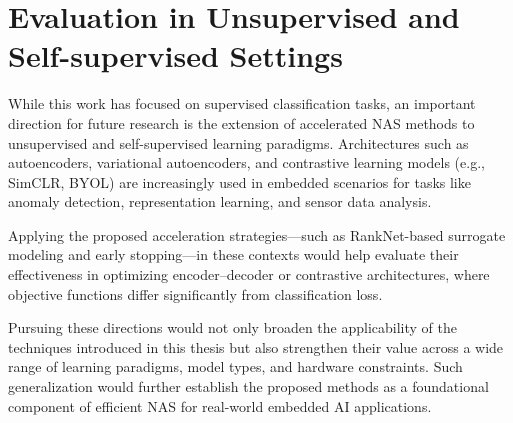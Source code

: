 \section{Evaluation in Unsupervised and Self-supervised Settings}

While this work has focused on supervised classification tasks, an important direction for future research is the extension of accelerated NAS methods to unsupervised and self-supervised learning paradigms. Architectures such as autoencoders, variational autoencoders, and contrastive learning models (e.g., SimCLR, BYOL) are increasingly used in embedded scenarios for tasks like anomaly detection, representation learning, and sensor data analysis.

Applying the proposed acceleration strategies—such as RankNet-based surrogate modeling and early stopping—in these contexts would help evaluate their effectiveness in optimizing encoder–decoder or contrastive architectures, where objective functions differ significantly from classification loss.

\bigskip

 Pursuing these directions would not only broaden the applicability of the techniques introduced in this thesis but also strengthen their value across a wide range of learning paradigms, model types, and hardware constraints. Such generalization would further establish the proposed methods as a foundational component of efficient NAS for real-world embedded AI applications.   



